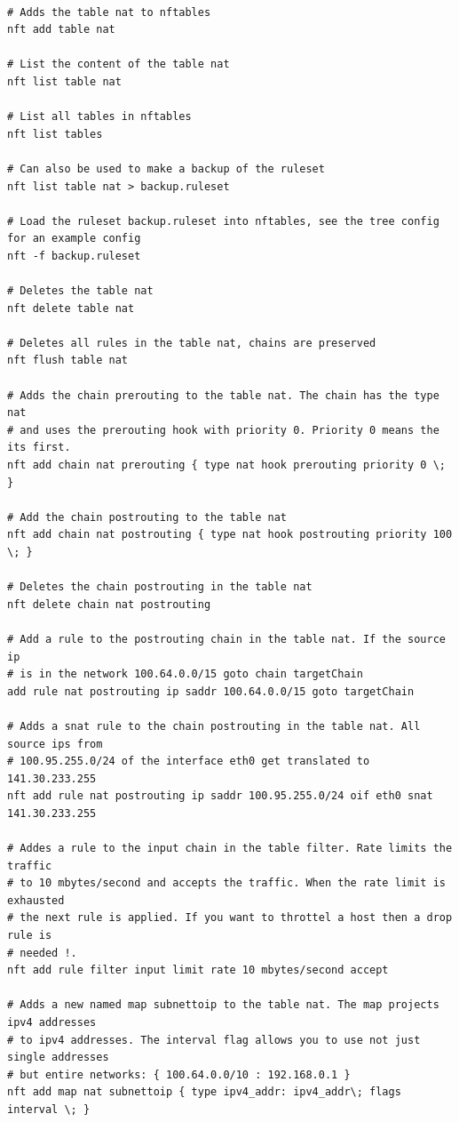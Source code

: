 \documentclass{report}
\begin{document}
\begingroup
\fontsize{9pt}{9pt}\selectfont
\begin{verbatim}

# Adds the table nat to nftables
nft add table nat

# List the content of the table nat
nft list table nat

# List all tables in nftables
nft list tables

# Can also be used to make a backup of the ruleset
nft list table nat > backup.ruleset

# Load the ruleset backup.ruleset into nftables, see the tree config for an example config
nft -f backup.ruleset

# Deletes the table nat
nft delete table nat

# Deletes all rules in the table nat, chains are preserved
nft flush table nat

# Adds the chain prerouting to the table nat. The chain has the type nat
# and uses the prerouting hook with priority 0. Priority 0 means the its first.
nft add chain nat prerouting { type nat hook prerouting priority 0 \; }

# Add the chain postrouting to the table nat
nft add chain nat postrouting { type nat hook postrouting priority 100 \; }

# Deletes the chain postrouting in the table nat
nft delete chain nat postrouting

# Add a rule to the postrouting chain in the table nat. If the source ip 
# is in the network 100.64.0.0/15 goto chain targetChain
add rule nat postrouting ip saddr 100.64.0.0/15 goto targetChain

# Adds a snat rule to the chain postrouting in the table nat. All source ips from
# 100.95.255.0/24 of the interface eth0 get translated to 141.30.233.255
nft add rule nat postrouting ip saddr 100.95.255.0/24 oif eth0 snat 141.30.233.255

# Addes a rule to the input chain in the table filter. Rate limits the traffic 
# to 10 mbytes/second and accepts the traffic. When the rate limit is exhausted 
# the next rule is applied. If you want to throttel a host then a drop rule is 
# needed !.
nft add rule filter input limit rate 10 mbytes/second accept

# Adds a new named map subnettoip to the table nat. The map projects ipv4 addresses
# to ipv4 addresses. The interval flag allows you to use not just single addresses 
# but entire networks: { 100.64.0.0/10 : 192.168.0.1 }
nft add map nat subnettoip { type ipv4_addr: ipv4_addr\; flags interval \; }


\end{verbatim}
\end{document}
